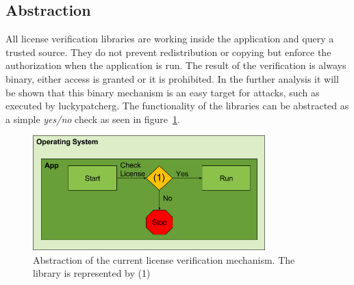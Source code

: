 \subsection{Abstraction} \label{section:license-abstraction}
All license verification libraries are working inside the application and query a trusted source.
They do not prevent redistribution or copying but enforce the authorization when the application is run.
The result of the verification is always binary, either access is granted or it is prohibited.
In the further analysis it will be shown that this binary mechanism is an easy target for attacks, such as executed by \gls{luckypatcherg}.
\newline
The functionality of the libraries can be abstracted as a simple \textit{yes/no} check as seen in figure~\ref{fig:verificationNow}.
\begin{figure}[h]
    \centering
    \includegraphics[width=0.8\textwidth]{data/verificationNow.png}
    \caption{Abstraction of the current license verification mechanism. The library is represented by (1)}
    \label{fig:verificationNow}
\end{figure}
